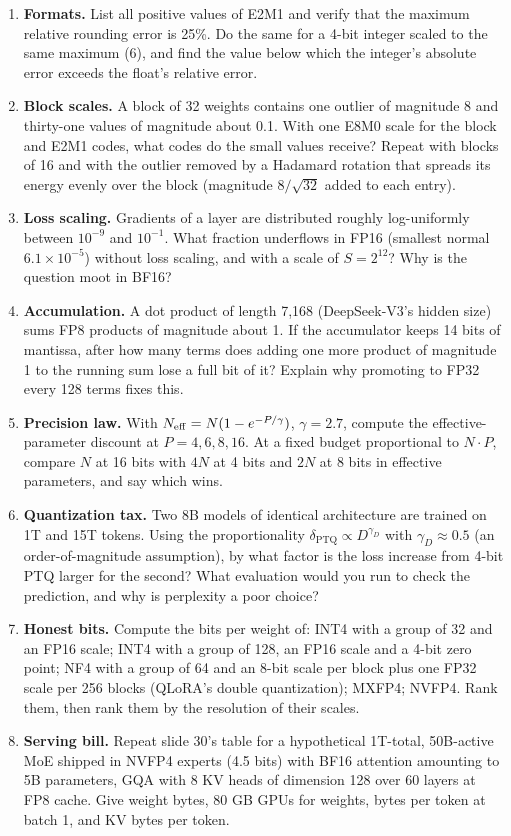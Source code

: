 \documentclass[11pt,letterpaper]{article}
\begin{document}
\begin{enumerate}[leftmargin=1.6em,itemsep=6pt]
\item \textbf{Formats.} List all positive values of E2M1 and verify that the maximum relative rounding error is 25\%. Do the same for a 4-bit integer scaled to the same maximum (6), and find the value below which the integer's absolute error exceeds the float's relative error.
\item \textbf{Block scales.} A block of 32 weights contains one outlier of magnitude 8 and thirty-one values of magnitude about 0.1. With one E8M0 scale for the block and E2M1 codes, what codes do the small values receive? Repeat with blocks of 16 and with the outlier removed by a Hadamard rotation that spreads its energy evenly over the block (magnitude $8/\sqrt{32}$ added to each entry).
\item \textbf{Loss scaling.} Gradients of a layer are distributed roughly log-uniformly between $10^{-9}$ and $10^{-1}$. What fraction underflows in FP16 (smallest normal $6.1\times10^{-5}$) without loss scaling, and with a scale of $S=2^{12}$? Why is the question moot in BF16?
\item \textbf{Accumulation.} A dot product of length 7,168 (DeepSeek-V3's hidden size) sums FP8 products of magnitude about 1. If the accumulator keeps 14 bits of mantissa, after how many terms does adding one more product of magnitude 1 to the running sum lose a full bit of it? Explain why promoting to FP32 every 128 terms fixes this.
\item \textbf{Precision law.} With $N_{\mathrm{eff}}=N(1-e^{-P/\gamma})$, $\gamma=2.7$, compute the effective-parameter discount at $P=4,6,8,16$. At a fixed budget proportional to $N\cdot P$, compare $N$ at 16 bits with $4N$ at 4 bits and $2N$ at 8 bits in effective parameters, and say which wins.
\item \textbf{Quantization tax.} Two 8B models of identical architecture are trained on 1T and 15T tokens. Using the proportionality $\delta_{\text{PTQ}}\propto D^{\gamma_D}$ with $\gamma_D\approx0.5$ (an order-of-magnitude assumption), by what factor is the loss increase from 4-bit PTQ larger for the second? What evaluation would you run to check the prediction, and why is perplexity a poor choice?
\item \textbf{Honest bits.} Compute the bits per weight of: INT4 with a group of 32 and an FP16 scale; INT4 with a group of 128, an FP16 scale and a 4-bit zero point; NF4 with a group of 64 and an 8-bit scale per block plus one FP32 scale per 256 blocks (QLoRA's double quantization); MXFP4; NVFP4. Rank them, then rank them by the resolution of their scales.
\item \textbf{Serving bill.} Repeat slide 30's table for a hypothetical 1T-total, 50B-active MoE shipped in NVFP4 experts (4.5 bits) with BF16 attention amounting to 5B parameters, GQA with 8 KV heads of dimension 128 over 60 layers at FP8 cache. Give weight bytes, 80 GB GPUs for weights, bytes per token at batch 1, and KV bytes per token.
\end{enumerate}
\clearpage
\end{document}
